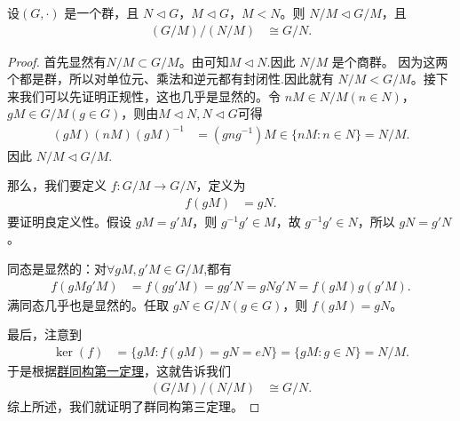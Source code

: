\documentclass[../../main.tex]{subfiles}
\begin{document}
\begin{theorem}[群同构第三定理]\label{theorem:群同构第三定理}
设\((G, \cdot)\) 是一个群，且 \(N \lhd G\)，\(M \lhd G\)，\(M < N\)。则 \(N/M \lhd G/M\)，且
\begin{align*}
(G/M)/(N/M) &\cong G/N .
\end{align*}
\end{theorem}
\begin{proof}
首先显然有\(N/M \subset G/M\)。由可知$M\lhd N$.因此 \(N/M\) 是个商群。
因为这两个都是群，所以对单位元、乘法和逆元都有封闭性.因此就有 \(N/M < G/M\)。接下来我们可以先证明正规性，这也几乎是显然的。令 \(nM \in N/M (n \in N)\)，\(gM \in G/M (g \in G)\)，则由$M\lhd N,N\lhd G$可得
\begin{align*}
(gM)(nM)(gM)^{-1} &= (gng^{-1})M \in \{nM : n \in N\} = N/M .
\end{align*}
因此 \(N/M \lhd G/M\).

那么，我们要定义 \(f: G/M \to G/N\)，定义为
\begin{align*}
f(gM) &= gN .
\end{align*}
要证明良定义性。假设 \(gM = g'M\)，则 \(g^{-1}g' \in M\)，故 \(g^{-1}g' \in N\)，所以 \(gN = g'N\)。

同态是显然的：对$\forall gM,g'M\in G/M$,都有
\begin{align*}
f(gMg'M) &= f(gg'M) = gg'N = gNg'N = f(gM)g(g'M) .
\end{align*}
满同态几乎也是显然的。任取 \(gN \in G/N (g \in G)\)，则 \(f(gM) = gN\)。

最后，注意到
\begin{align*}
\ker(f) &= \{gM : f(gM) = gN = eN\} = \{gM : g \in N\} = N/M .
\end{align*}
于是根据\hyperref[theorem:群同构第一定理]{群同构第一定理}，这就告诉我们
\begin{align*}
(G/M)/(N/M) &\cong G/N.
\end{align*}
综上所述，我们就证明了群同构第三定理。 
\end{proof}
\end{document}

